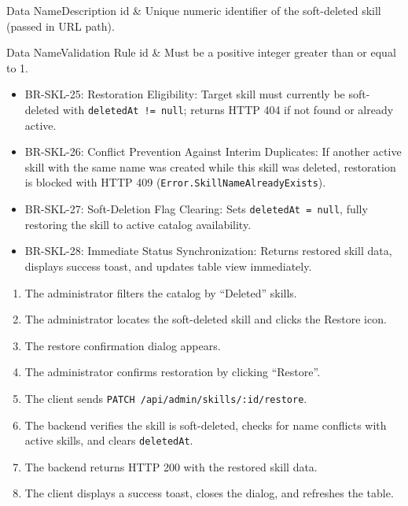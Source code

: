 
\begin{specdatatable}{Data Name}{Description}
id & Unique numeric identifier of the soft-deleted skill (passed in URL path).\\ \hline
\end{specdatatable}

\begin{specdatatable}{Data Name}{Validation Rule}
id & Must be a positive integer greater than or equal to 1.\\ \hline
\end{specdatatable}

\begin{itemize}[leftmargin=1.6em,topsep=3pt,itemsep=2pt,parsep=0pt,label=$\bullet$]\brrulelist
    \item BR-SKL-25: Restoration Eligibility: Target skill must currently be soft-deleted with \texttt{deletedAt != null}; returns HTTP 404 if not found or already active.
    \item BR-SKL-26: Conflict Prevention Against Interim Duplicates: If another active skill with the same name was created while this skill was deleted, restoration is blocked with HTTP 409 (\texttt{Error.SkillNameAlreadyExists}).
    \item BR-SKL-27: Soft-Deletion Flag Clearing: Sets \texttt{deletedAt = null}, fully restoring the skill to active catalog availability.
    \item BR-SKL-28: Immediate Status Synchronization: Returns restored skill data, displays success toast, and updates table view immediately.
\end{itemize}

\begin{enumerate}[leftmargin=1.6em,topsep=3pt,itemsep=2pt,parsep=0pt]
    \item The administrator filters the catalog by ``Deleted'' skills.
    \item The administrator locates the soft-deleted skill and clicks the Restore icon.
    \item The restore confirmation dialog appears.
    \item The administrator confirms restoration by clicking ``Restore''.
    \item The client sends \texttt{PATCH /api/admin/skills/:id/restore}.
    \item The backend verifies the skill is soft-deleted, checks for name conflicts with active skills, and clears \texttt{deletedAt}.
    \item The backend returns HTTP 200 with the restored skill data.
    \item The client displays a success toast, closes the dialog, and refreshes the table.
\end{enumerate}

